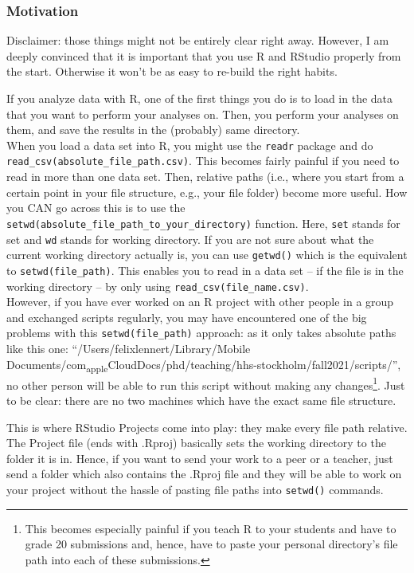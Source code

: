 \documentclass[
]{book}
\begin{document}
\hypertarget{motivation}{%
\subsubsection{Motivation}\label{motivation}}

Disclaimer: those things might not be entirely clear right away. However, I am deeply convinced that it is important that you use R and RStudio properly from the start. Otherwise it won't be as easy to re-build the right habits.

If you analyze data with R, one of the first things you do is to load in the data that you want to perform your analyses on. Then, you perform your analyses on them, and save the results in the (probably) same directory.\\
When you load a data set into R, you might use the \texttt{readr} package and do \texttt{read\_csv(absolute\_file\_path.csv)}. This becomes fairly painful if you need to read in more than one data set. Then, relative paths (i.e., where you start from a certain point in your file structure, e.g., your file folder) become more useful.
How you CAN go across this is to use the \texttt{setwd(absolute\_file\_path\_to\_your\_directory)} function. Here, \texttt{set} stands for set and \texttt{wd} stands for working directory. If you are not sure about what the current working directory actually is, you can use \texttt{getwd()} which is the equivalent to \texttt{setwd(file\_path)}. This enables you to read in a data set -- if the file is in the working directory -- by only using \texttt{read\_csv(file\_name.csv)}.\\
However, if you have ever worked on an R project with other people in a group and exchanged scripts regularly, you may have encountered one of the big problems with this \texttt{setwd(file\_path)} approach: as it only takes absolute paths like this one: ``/Users/felixlennert/Library/Mobile Documents/com\textsubscript{apple}CloudDocs/phd/teaching/hhs-stockholm/fall2021/scripts/'', no other person will be able to run this script without making any changes\footnote{This becomes especially painful if you teach R to your students and have to grade 20 submissions and, hence, have to paste your personal directory's file path into each of these submissions.}. Just to be clear: there are no two machines which have the exact same file structure.

This is where RStudio Projects come into play: they make every file path relative. The Project file (ends with .Rproj) basically sets the working directory to the folder it is in. Hence, if you want to send your work to a peer or a teacher, just send a folder which also contains the .Rproj file and they will be able to work on your project without the hassle of pasting file paths into \texttt{setwd()} commands.
\end{document}
